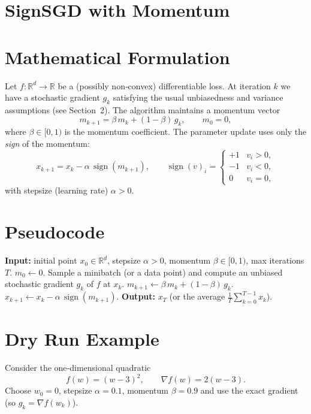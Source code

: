 \documentclass{article}
\begin{document}
\section*{SignSGD with Momentum}

\section*{Mathematical Formulation}
Let $f:\mathbb{R}^d\to\mathbb{R}$ be a (possibly non‑convex) differentiable loss.  
At iteration $k$ we have a stochastic gradient $g_k$ satisfying the usual unbiasedness and variance assumptions (see Section~2).  
The algorithm maintains a momentum vector
\[
m_{k+1}= \beta\, m_{k} + (1-\beta)\, g_{k},\qquad m_0 = 0,
\]
where $\beta\in[0,1)$ is the momentum coefficient.  
The parameter update uses only the \emph{sign} of the momentum:
\[
x_{k+1}= x_{k} - \alpha \, \operatorname{sign}(m_{k+1}),\qquad 
\operatorname{sign}(v)_i = 
\begin{cases}
+1 & v_i>0,\\
-1 & v_i<0,\\
0  & v_i=0,
\end{cases}
\]
with stepsize (learning rate) $\alpha>0$.

\section*{Pseudocode}
\begin{algorithm}[H]
\caption{SignSGD with Momentum}
\begin{algorithmic}[1]
\STATE \textbf{Input:} initial point $x_0\in\mathbb{R}^d$, stepsize $\alpha>0$, momentum $\beta\in[0,1)$, max iterations $T$.
\STATE $m_0 \gets 0$.
    \STATE Sample a minibatch (or a data point) and compute an unbiased stochastic gradient $g_k$ of $f$ at $x_k$.
    \STATE $m_{k+1}\gets \beta\, m_k + (1-\beta)\, g_k$.
    \STATE $x_{k+1}\gets x_k - \alpha\,\operatorname{sign}(m_{k+1})$.
\ENDFOR
\STATE \textbf{Output:} $x_T$ (or the average $\frac1T\sum_{k=0}^{T-1}x_k$).
\end{algorithmic}
\end{algorithm}

\section*{Dry Run Example}
Consider the one‑dimensional quadratic
\[
f(w)= (w-3)^2, \qquad \nabla f(w)=2(w-3).
\]
Choose $w_0=0$, stepsize $\alpha=0.1$, momentum $\beta=0.9$ and use the exact gradient (so $g_k=\nabla f(w_k)$).  
\end{document}

